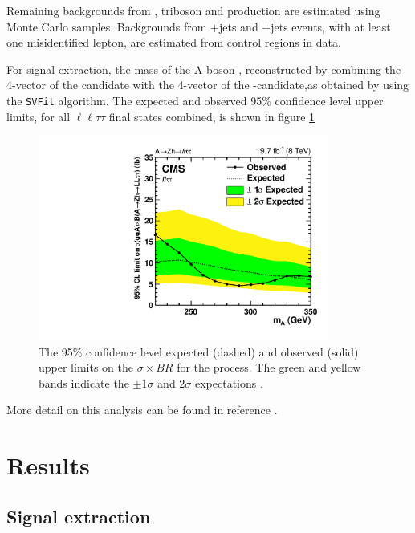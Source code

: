 Remaining backgrounds from \ZZ, triboson and \ttbar\PZ production are estimated using
Monte Carlo samples. Backgrounds from \PZ+jets %
and \WZ+jets %
events, with at least one misidentified lepton, are estimated from control regions in data.

For signal extraction, the mass of the A boson \mA, reconstructed by combining the
4-vector of the \PZ candidate with the 4-vector of the \Ph -candidate,as obtained by using the 
\texttt{SVFit} algorithm. The expected and observed 95\% confidence level upper limits, for
all $\ell\ell\tau\tau$ final states combined, is shown in figure \ref{fig:AZhUpperLimits}

\begin{figure}[h!]
\begin{center}
\includegraphics[width=0.85\textwidth]{Hhh/Plots/CMS-HIG-14-034_Figure_010-a.pdf}
\caption{The 95\% confidence level expected (dashed) and observed (solid)
upper limits on the $\sigma \times BR$ for the \AtoZhtolltautau process.
The green and yellow bands indicate the $\pm 1 \sigma $ and $2\sigma$
expectations \cite{CMS-HIG-14-034}.}
\label{fig:AZhUpperLimits}
\end{center}
\end{figure}



More detail on this analysis can be found in reference \cite{CMS-HIG-14-034}.




\section{Results}
\label{sec:hhh_results}

\subsection{Signal extraction}
\label{sec:hhh_results_extraction}

